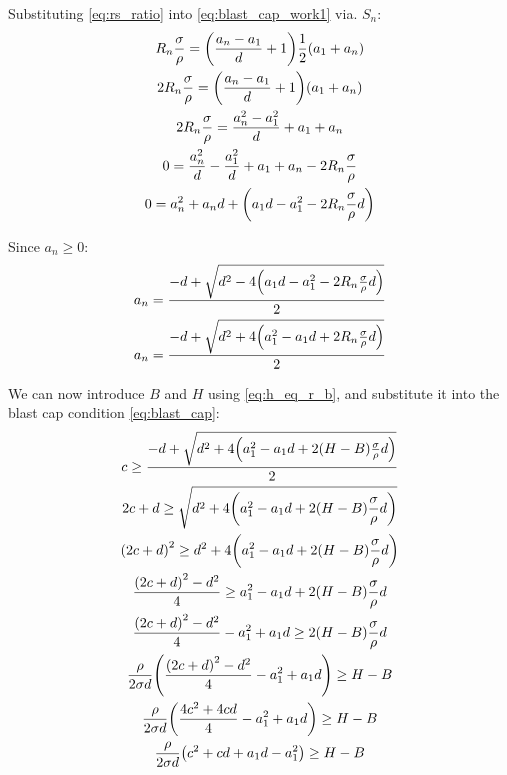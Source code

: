 \documentclass{article}
\begin{document}
Substituting \eqref{eq:rs_ratio} into \eqref{eq:blast_cap_work1} via. $S_n$:
\begin{gather}
    R_n \frac{\sigma}{\rho} = \parens*{\frac{a_n - a_1}{d} + 1} \frac{1}{2} \parens*{a_1 + a_n}
    \\
    2 R_n \frac{\sigma}{\rho} = \parens*{\frac{a_n - a_1}{d} + 1} \parens*{a_1 + a_n}
    \\
    2 R_n \frac{\sigma}{\rho} = \frac{a_n^2 - a_1^2}{d} + a_1 + a_n
    \\
    0 = \frac{a_n^2}{d} - \frac{a_1^2}{d} + a_1 + a_n - 2 R_n \frac{\sigma}{\rho}
    \\
    0 = a_n^2 + a_n d + \parens*{a_1 d - a_1^2 - 2 R_n \frac{\sigma}{\rho} d}
\end{gather}

Since $a_n \ge 0$:
\begin{gather}
    a_n = \frac{-d + \sqrt{d^2 - 4 \parens*{a_1 d - a_1^2 - 2 R_n \frac{\sigma}{\rho} d}}}{2} 
    \\
    a_n = \frac{-d + \sqrt{d^2 + 4 \parens*{a_1^2 - a_1 d + 2 R_n \frac{\sigma}{\rho} d}}}{2} 
\end{gather}

We can now introduce $B$ and $H$ using \eqref{eq:h_eq_r_b}, and substitute it into the blast cap condition \eqref{eq:blast_cap}:
\begin{gather}
    c \ge \frac{-d + \sqrt{d^2 + 4 \parens*{a_1^2 - a_1 d + 2 \parens*{H - B} \frac{\sigma}{\rho} d}}}{2} 
    \\
    2 c + d \ge \sqrt{d^2 + 4 \parens*{a_1^2 - a_1 d + 2 \parens*{H - B} \frac{\sigma}{\rho} d}}
    \\
    \parens*{2 c + d}^2 \ge d^2 + 4 \parens*{a_1^2 - a_1 d + 2 \parens*{H - B} \frac{\sigma}{\rho} d}
    \\
    \frac{\parens*{2 c + d}^2 - d^2}{4} \ge a_1^2 - a_1 d + 2 \parens*{H - B} \frac{\sigma}{\rho} d
    \\
    \frac{\parens*{2 c + d}^2 - d^2}{4} - a_1^2 + a_1 d \ge 2 \parens*{H - B} \frac{\sigma}{\rho} d
    \\
    \frac{\rho}{2 \sigma d} \parens*{\frac{\parens*{2 c + d}^2 - d^2}{4} - a_1^2 + a_1 d} \ge H - B
    \\
    \frac{\rho}{2 \sigma d} \parens*{\frac{4 c^2 + 4 c d}{4} - a_1^2 + a_1 d} \ge H - B
    \\
    \frac{\rho}{2 \sigma d} \parens*{c^2 + c d + a_1 d - a_1^2} \ge H - B
    \label{eq:blast_cap_work2}
\end{gather}
\end{document}
